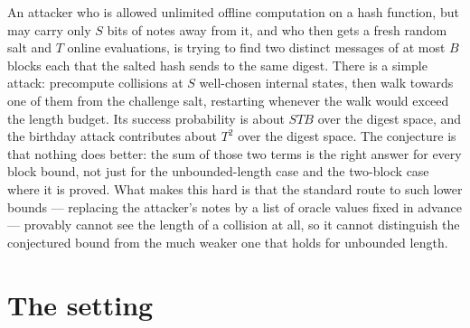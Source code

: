 \documentclass{aicr-conjecture}
\begin{document}

\vspace{0.4em}

\begin{informalconjecture}
An attacker who is allowed unlimited offline computation on a hash
function, but may carry only $S$ bits of notes away from it, and who
then gets a fresh random salt and $T$ online evaluations, is trying to
find two distinct messages of at most $B$ blocks each that the salted
hash sends to the same digest. There is a simple attack: precompute
collisions at $S$ well-chosen internal states, then walk towards one of
them from the challenge salt, restarting whenever the walk would exceed
the length budget. Its success probability is about $STB$ over the
digest space, and the birthday attack contributes about $T^{2}$ over
the digest space. The conjecture is that nothing does better: the sum
of those two terms is the right answer for every block bound, not just
for the unbounded-length case and the two-block case where it is
proved. What makes this hard is that the standard route to such lower
bounds --- replacing the attacker's notes by a list of oracle values
fixed in advance --- provably cannot see the length of a collision at
all, so it cannot distinguish the conjectured bound from the much
weaker one that holds for unbounded length.
\end{informalconjecture}

\section{The setting}\label{sec:setting}
\end{document}
